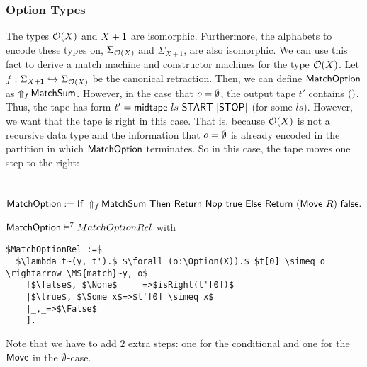 \subsubsection{Option Types}
\label{sec:match-option}

The types $\Option(X)$ and $X+\Unit$ are isomorphic.  Furthermore, the alphabets to encode these types on, $\Sigma_{\Option(X)}$ and $\Sigma_{X+1}$,
are also isomorphic.  We can use this fact to derive a match machine and constructor machines for the type $\Option(X)$.  Let
$f : \Sigma_{X+\Unit} \hookrightarrow \Sigma_{\Option(X)}$ be the canonical retraction.  Then, we can define $\MS{MatchOption}$ as
$\LiftAlphabet{\MS{MatchSum}}{f}$.  However, in the case that $o=\None$, the output tape $t'$ contains $\unit$.  Thus, the tape has form
$t' = \MS{midtape}~ls~\MS{START}~[\MS{STOP}]$ (for some $ls$).  However, we want that the tape is right in this case.  That is, because $\Option(X)$
is not a recursive data type and the information that $o=\None$ is already encoded in the partition in which $\MS{MatchOption}$ terminates.  So in
this case, the tape moves one step to the right:
\begin{definition}[$\MS{MatchOption}$][MatchOption]
  \label{def:MatchOption}
  ~
  \[
    \MS{MatchOption} := \If{\LiftAlphabet{\MS{MatchSum}}{f}}{\Return{\Nop}{\true}}{\Return{(\MS{Move}~R)}{\false}}.
  \]
\end{definition}

\begin{lemma}
  \label{lem:MatchOption_Realise}
  $\MS{MatchOption} \RealiseIn{7} MatchOptionRel$ with
\begin{lstlisting}[style=semicoqstyle]
$MatchOptionRel :=$
  $\lambda t~(y, t').$ $\forall (o:\Option(X)).$ $t[0] \simeq o \rightarrow \MS{match}~y, o$
    [$\false$, $\None$     =>$isRight(t'[0])$
    |$\true$, $\Some x$=>$t'[0] \simeq x$
    |_,_=>$\False$
    ].
\end{lstlisting}
\end{lemma}
Note that we have to add $2$ extra steps: one for the conditional and one for the $\MS{Move}$ in the $\None$-case.

